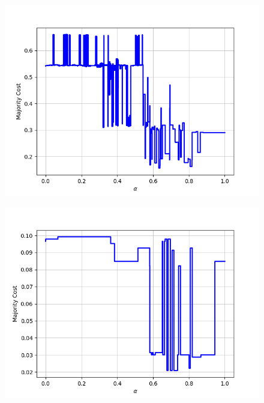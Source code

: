 \begin{figure}[h]
\begin{minipage}{.24\textwidth}
\end{minipage}
\begin{minipage}{.24\textwidth}
  \centering
  {\includegraphics[width=\linewidth]{plots/nell-ac/creativework}}
\end{minipage}
\begin{minipage}{.24\textwidth}
  \centering
  {\includegraphics[width=\linewidth]{plots/nell-ac/date}}
\end{minipage}
\begin{minipage}{.24\textwidth}
  \centering

\end{minipage}
\end{figure}

